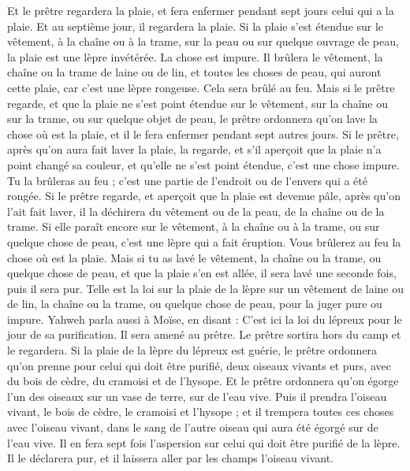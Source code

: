 \begin{multicols}{2}
Et le prêtre regardera la plaie, et fera enfermer pendant sept jours celui qui a la plaie.
Et au septième jour, il regardera la plaie. Si la plaie s'est étendue sur le vêtement, à la chaîne ou à la trame, sur la peau ou sur quelque ouvrage de peau, la plaie est une lèpre invétérée. La chose est impure.
Il brûlera le vêtement, la chaîne ou la trame de laine ou de lin, et toutes les choses de peau, qui auront cette plaie, car c'est une lèpre rongeuse. Cela sera brûlé au feu.
Mais si le prêtre regarde, et que la plaie ne s'est point étendue sur le vêtement, sur la chaîne ou sur la trame, ou sur quelque objet de peau,
le prêtre ordonnera qu'on lave la chose où est la plaie, et il le fera enfermer pendant sept autres jours.
Si le prêtre, après qu'on aura fait laver la plaie, la regarde, et s'il aperçoit que la plaie n'a point changé sa couleur, et qu'elle ne s'est point étendue, c'est une chose impure. Tu la brûleras au feu ; c'est une partie de l'endroit ou de l'envers qui a été rongée.
Si le prêtre regarde, et aperçoit que la plaie est devenue pâle, après qu'on l'ait fait laver, il la déchirera du vêtement ou de la peau, de la chaîne ou de la trame.
Si elle paraît encore sur le vêtement, à la chaîne ou à la trame, ou sur quelque chose de peau, c'est une lèpre qui a fait éruption. Vous brûlerez au feu la chose où est la plaie.
Mais si tu as lavé le vêtement, la chaîne ou la trame, ou quelque chose de peau, et que la plaie s'en est allée, il sera lavé une seconde fois, puis il sera pur.
Telle est la loi sur la plaie de la lèpre sur un vêtement de laine ou de lin, la chaîne ou la trame, ou quelque chose de peau, pour la juger pure ou impure.
\VerseOne{}Yahweh parla aussi à Moïse, en disant :
C'est ici la loi du lépreux pour le jour de sa purification. Il sera amené au prêtre.
Le prêtre sortira hors du camp et le regardera. Si la plaie de la lèpre du lépreux est guérie,
le prêtre ordonnera qu'on prenne pour celui qui doit être purifié, deux oiseaux vivants et purs, avec du bois de cèdre, du cramoisi et de l'hysope.
Et le prêtre ordonnera qu'on égorge l'un des oiseaux sur un vase de terre, sur de l'eau vive.
Puis il prendra l'oiseau vivant, le bois de cèdre, le cramoisi et l'hysope ; et il trempera toutes ces choses avec l'oiseau vivant, dans le sang de l'autre oiseau qui aura été égorgé sur de l'eau vive.
Il en fera sept fois l'aspersion sur celui qui doit être purifié de la lèpre. Il le déclarera pur, et il laissera aller par les champs l'oiseau vivant.

\end{multicols}
